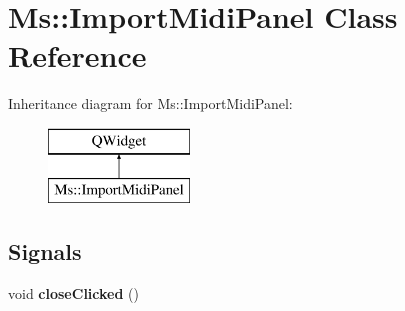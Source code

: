 \hypertarget{class_ms_1_1_import_midi_panel}{}\section{Ms\+:\+:Import\+Midi\+Panel Class Reference}
\label{class_ms_1_1_import_midi_panel}
Inheritance diagram for Ms\+:\+:Import\+Midi\+Panel\+:\begin{figure}[H]
\begin{center}
\leavevmode
\includegraphics[height=2.000000cm]{class_ms_1_1_import_midi_panel}
\end{center}
\end{figure}
\subsection*{Signals}
\begin{DoxyCompactItemize}
\item 
\mbox{\label{class_ms_1_1_import_midi_panel_a2dd3cf1be8806393190aa8744f647731}} 
void {\bfseries close\+Clicked} ()
\end{DoxyCompactItemize}

